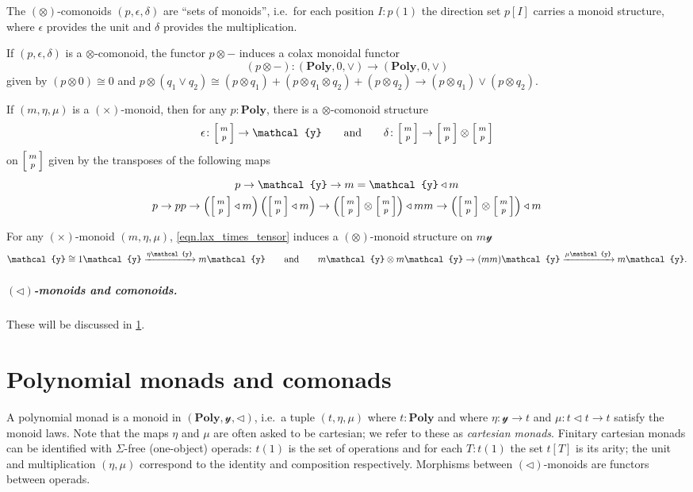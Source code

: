 \documentclass[11pt, one side, article]{memoir}
\makeatletter
\theoremstyle{definition}
\theoremstyle{plain}
\newcommand{\Cat}[1]{\mathbf{#1}}%
\newcommand{\To}[2][]{\xrightarrow[#1]{\tn{$#2$}}}
\newcommand{\tn}[1]{\textnormal{#1}}
\newcommand{\yon}{{\mathcal{y}}}
\newcommand{\poly}{\Cat{Poly}}
\newcommand{\0}{\textsf{0}}
\newcommand{\1}{\tn{\textsf{1}}}
\newcommand{\tri}{\mathbin{\triangleleft}}
\newcommand{\biglens}[2]{
     \begin{bmatrix}{\vphantom{f_f^f}#2} \\ {\vphantom{f_f^f}#1} \end{bmatrix}
}
\newcommand{\littlelens}[2]{
     \begin{bsmallmatrix}{\vphantom{f}#2} \\ {\vphantom{f}#1} \end{bsmallmatrix}
}
\newcommand{\lens}[2]{
  \relax\if@display
     \biglens{#1}{#2}
  \else
     \littlelens{#1}{#2}
  \fi
}
\newcommand{\hh}[2][]{#1 \tn{#2} #1}
\newcommand{\qqand}{\hh[\qquad]{and}}
\makeatother
\begin{document}
The $(\otimes)$-comonoids $(p,\epsilon,\delta)$ are ``sets of monoids'', i.e.\ for each position $I:p(1)$ the direction set $p[I]$ carries a monoid structure, where $\epsilon$ provides the unit and $\delta$ provides the multiplication.

If $(p,\epsilon,\delta)$ is a $\otimes$-comonoid, the functor $p\otimes-$ induces a colax monoidal functor
\begin{equation}
	(p\otimes -)\colon(\poly,0,\vee)\to(\poly,0,\vee)
\end{equation}
given by $(p\otimes 0)\cong0$ and $p\otimes (q_1\vee q_2)\cong(p\otimes q_1)+(p\otimes q_1\otimes q_2)+(p\otimes q_2)\to(p\otimes q_1)\vee(p\otimes q_2)$.

If $(m,\eta,\mu)$ is a $(\times)$-monoid, then for any $p:\poly$, there is a $\otimes$-comonoid structure
\begin{equation}
	\epsilon\colon\lens{p}{m}\to\yon
	\qqand
	\delta\colon\lens{p}{m}\to\lens{p}{m}\otimes\lens{p}{m}
\end{equation}
on $\lens{p}{m}$ given by the transposes of the following maps
\begin{gather}
	p\to \yon\to m=\yon\tri m\\
	p\to pp\to\left(\lens{p}{m}\tri m\right)\left(\lens{p}{m}\tri m\right)\to\left(\lens{p}{m}\otimes\lens{p}{m}\right)\tri mm\to\left(\lens{p}{m}\otimes\lens{p}{m}\right)\tri m
\end{gather}

For any $(\times)$-monoid $(m,\eta,\mu)$, \eqref{eqn.lax_times_tensor} induces a $(\otimes)$-monoid structure on $m\yon$
\begin{equation}
	\yon\cong1\yon\To{\eta\yon} m\yon
	\qqand
	m\yon\otimes m\yon\to (mm)\yon\To{\mu\yon} m\yon.
\end{equation}



\paragraph{$(\tri)$-monoids and comonoids.} These will be discussed in \cref{chap.monad_comonad}.


\chapter{Polynomial monads and comonads}\label{chap.monad_comonad}

A polynomial monad is a monoid in $(\poly,\yon,\tri)$, i.e.\ a tuple $(t,\eta,\mu)$ where $t:\poly$ and where $\eta\colon\yon\to t$ and $\mu\colon t\tri t\to t$ satisfy the monoid laws. Note that the maps $\eta$ and $\mu$ are often asked to be cartesian; we refer to these as \emph{cartesian monads}. Finitary cartesian monads can be identified with $\Sigma$-free (one-object) operads: $t(1)$ is the set of operations and for each $T:t(1)$ the set $t[T]$ is its arity; the unit and multiplication $(\eta,\mu)$ correspond to the identity and composition respectively. Morphisms between $(\tri)$-monoids are functors between operads.
\end{document}
